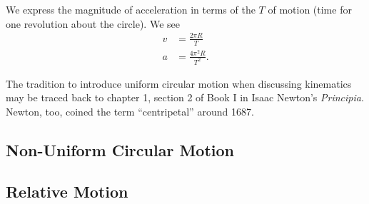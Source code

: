 We express the magnitude of acceleration in terms of the 
$T$ of motion (time for one revolution about the circle). We see
\begin{subequations}
\begin{align}
v &= \frac{2\pi R}{T}\\
a &=\frac{4\pi^{2}R}{T^{2}}.
\end{align}
\end{subequations}

\begin{rmk}
The tradition to introduce uniform circular motion when discussing
kinematics may be traced back to chapter 1, section 2 of
Book I in Isaac Newton's \emph{Principia}. Newton, too, coined the term
``centripetal'' around 1687.
\end{rmk}

\subsection{Non-Uniform Circular Motion}

\subsection{Relative Motion}
